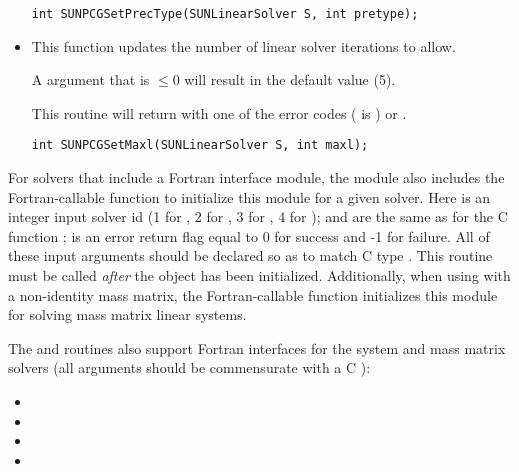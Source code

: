\begin{itemize}
  \verb|int SUNPCGSetPrecType(SUNLinearSolver S, int pretype);|


\item {}

  This function updates the number of linear solver iterations to
  allow. 

  A  argument that is $\le0$ will result in the default
  value (5).

  This routine will return with one of the error codes
   ( is ) or .
  
  \verb|int SUNPCGSetMaxl(SUNLinearSolver S, int maxl);|

\end{itemize}
For solvers that include a Fortran interface module, the
{\sunlinsolpcg} module also includes the Fortran-callable
function  to initialize
this {\sunlinsolpcg} module for a given {\sundials} solver.
Here  is an integer input solver id (1 for {\cvode}, 2 for {\ida}, 3
for {\kinsol}, 4 for {\arkode});  and  are the
same as for the C function ;  is an error return
flag equal to 0 for success and -1 for failure.  All of these input
arguments should be declared so as to match C type .  This
routine must be called \emph{after} the {\nvector} object has been
initialized.  Additionally, when using {\arkode} with a non-identity
mass matrix, the Fortran-callable function 
 initializes this
{\sunlinsolpcg} module for solving mass matrix linear systems.

The  and  routines also
support Fortran interfaces for the system and mass matrix solvers (all
arguments should be commensurate with a C ):
\begin{itemize}
\item {}
\item {}
\item {}
\item {}
\end{itemize}
